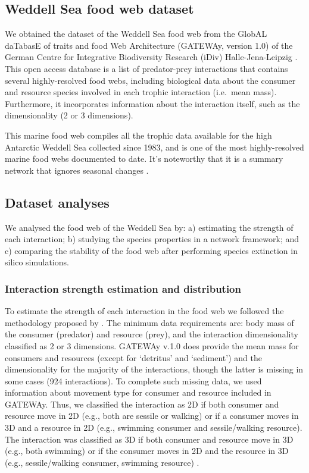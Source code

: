 \documentclass[gc, manuscript]{copernicus}
\begin{document}
\subsection{Weddell Sea food web dataset}

We obtained the dataset of the Weddell Sea food web from the GlobAL
daTabasE of traits and food Web Architecture (GATEWAy, version 1.0) of
the German Centre for Integrative Biodiversity Research (iDiv)
Halle-Jena-Leipzig \citep{Brose2018}. This open access database is a
list of predator-prey interactions that contains several highly-resolved
food webs, including biological data about the consumer and resource
species involved in each trophic interaction (i.e.~mean mass).
Furthermore, it incorporates information about the interaction itself,
such as the dimensionality (2 or 3 dimensions).

This marine food web compiles all the trophic data available for the
high Antarctic Weddell Sea collected since 1983, and is one of the most
highly-resolved marine food webs documented to date. It's noteworthy
that it is a summary network that ignores seasonal changes
\citep{Jacob2011}.

\subsection{Dataset analyses}

We analysed the food web of the Weddell Sea by: a) estimating the
strength of each interaction; b) studying the species properties in a
network framework; and c) comparing the stability of the food web after
performing species extinction in silico simulations.

\subsubsection{Interaction strength estimation and distribution}

To estimate the strength of each interaction in the food web we followed
the methodology proposed by \citet{Pawar2012}. The minimum data
requirements are: body mass of the consumer (predator) and resource
(prey), and the interaction dimensionality classified as 2 or 3
dimensions. GATEWAy v.1.0 does provide the mean mass for consumers and
resources (except for `detritus' and `sediment') and the dimensionality
for the majority of the interactions, though the latter is missing in
some cases (924 interactions). To complete such missing data, we used
information about movement type for consumer and resource included in
GATEWAy. Thus, we classified the interaction as 2D if both consumer and
resource move in 2D (e.g., both are sessile or walking) or if a consumer
moves in 3D and a resource in 2D (e.g., swimming consumer and
sessile/walking resource). The interaction was classified as 3D if both
consumer and resource move in 3D (e.g., both swimming) or if the
consumer moves in 2D and the resource in 3D (e.g., sessile/walking
consumer, swimming resource) \citep{Pawar2012}.
\end{document}
